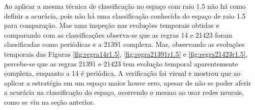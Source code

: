 \documentclass[12pt,a4paper]{report}
\begin{document}
    \begin{table}[htbp]
		\centering
		\caption{Regras do espaço elementar classificadas corretamente com o espectro de configuração de vizinhança, mas que não houve total concordância com a classe real.
		}
		\label{table:regrasClassificadasSpectroErro}
    \end{table}%

	Ao aplicar a mesma técnica de classificação no espaço com raio 1.5 não há como definir a acurácia, pois não há uma classificação conhecida do espaço de raio 1.5 para comparação. Mas uma inspeção nas evoluções temporais obtidas e comparando com as classificações observa-se que as regras 14 e 21423 foram classificadas como periódicas e a 21391 complexa. Mas, observando as evoluções temporais das Figuras \ref{fig:regra14r1.5}, \ref{fig:regra21391r1.5} e \ref{fig:regra21423r1.5}, percebe-se que as regras 21391 e 21423 tem evolução temporal aparentemente complexa, enquanto a 14 é periódica. A verificação foi visual e mostrou que ao aplicar a estratégia em um espaço maior houve erro, apesar de não se poder aferir a acurácia na classificação do espaço, ocorrendo o mesmo ao usar redes neurais, como se viu na seção anterior.
	
\end{document}
